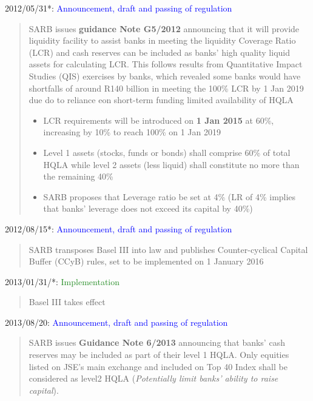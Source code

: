 \documentclass[
  letterpaper,
  DIV=11,
  numbers=noendperiod]{scrartcl}
\begin{document}
2012/05/31*:
\textcolor{blue}{Announcement, draft and passing of regulation}

\begin{quote}
SARB issues \textbf{guidance Note G5/2012} announcing that it will provide  liquidity facility to assist banks in meeting the liquidity Coverage Ratio (LCR) and cash reserves can be included as banks' high quality liquid assets for calculating LCR. This follows results from Quantitative Impact Studies (QIS) exercises by banks,  which revealed some banks would have shortfalls of around R140 billion in meeting the 100\% LCR  by 1 Jan 2019 due do to reliance eon short-term funding limited availability of HQLA

\begin{itemize}
    \item LCR requirements will be introduced on \textbf{1 Jan 2015} at 60\%, increasing by 10\% to reach 100\% on 1 Jan 2019
\item Level 1 assets (stocks, funds or bonds) shall comprise 60\% of total HQLA  while level 2 assets (less liquid) shall constitute no more than the remaining 40\%
\item SARB proposes that Leverage ratio be set at 4\% (LR of 4\% implies that banks' leverage does not exceed its capital by 40\%)
\end{itemize}

\end{quote}

2012/08/15*:
\textcolor{blue}{Announcement, draft and passing of regulation}

\begin{quote}
SARB transposes Basel III into law and publishes Counter-cyclical Capital Buffer (CCyB) rules, set to be implemented on 1 January 2016
\end{quote}

2013/01/31/*: \textcolor{ForestGreen}{Implementation}

\begin{quote}
    Basel III takes effect
\end{quote}

2013/08/20:
\textcolor{blue}{Announcement, draft and passing of regulation}

\begin{quote}
 SARB issues \textbf{Guidance Note 6/2013} announcing that banks' cash reserves may be included as part of their level 1 HQLA. Only equities listed on JSE's main exchange and included on Top 40 Index shall be considered as level2 HQLA (\textit{Potentially limit banks' ability to raise capital}).
\end{quote}
\end{document}
